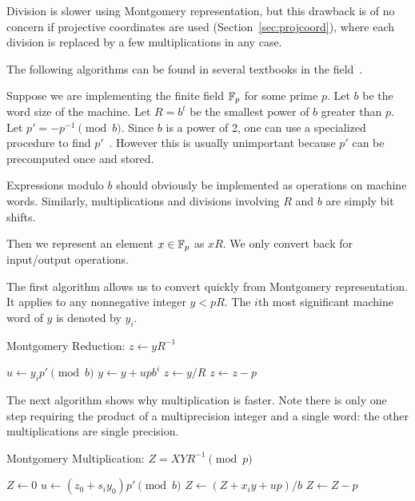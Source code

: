 Division is slower using Montgomery representation, but this drawback is
of no concern if projective coordinates are used (Section~\ref{sec:projcoord}),
where each division is replaced by a few multiplications in any case.

The following algorithms can be found in several textbooks in the
field~\cite{bss, handbook}.

Suppose we are implementing the finite field $\mathbb{F}_p$ for some prime $p$.
Let $b$ be the word size of the machine. Let $R = b^t$ be the smallest
power of $b$ greater than $p$. Let $p' = -p^{-1} \pmod b$.
Since $b$ is a power of 2, one can use a specialized procedure
to find $p'$~\cite[Algorithm II.5]{bss}. However this is usually unimportant
because $p'$ can be precomputed once and stored.

Expressions modulo $b$ should obviously be implemented as
operations on machine words. Similarly, multiplications and divisions
involving $R$ and $b$ are simply bit shifts.

Then we represent an element $x\in\mathbb{F}_p$ as $xR$. We only convert back
for input/output operations.

The first algorithm allows us to convert quickly from Montgomery
representation. It applies to any nonnegative integer $y < pR$.
The $i$th most significant machine word of $y$ is
denoted by $y_i$.

\begin{algorithm}
\caption {Montgomery Reduction: $z \gets yR^{-1}$}
\begin{algorithmic}[1]
\STATE $u\gets y_i p' \pmod b$
\STATE $y\gets y + upb^i$
\ENDFOR
\STATE $z\gets y/R$
\STATE $z\gets z-p$
\ENDIF
\end{algorithmic}
\end{algorithm}

The next algorithm shows why multiplication is faster. Note
there is only one step requiring the product of a multiprecision integer
and a single word: the other multiplications are single precision.

\begin{algorithm}
\caption {Montgomery Multiplication: $Z = X Y R^{-1} \pmod p$}
\begin{algorithmic}[1]
\STATE $Z\gets 0$
\STATE $u\gets (z_0 + s_i y_0) p' \pmod b$
\STATE $Z\gets (Z+x_i y + u p)/b$
\ENDFOR
{}
\STATE $Z\gets Z-p$
\ENDIF
\end{algorithmic}
\end{algorithm}

